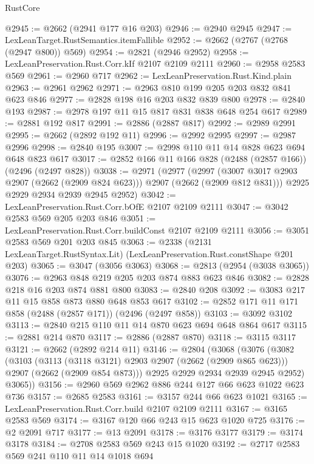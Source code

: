 \begin{lexlean}{RustCore}
\begin{coremodule}
@2945 := @2662 (@2941 @177 @16 @203)
@2946 := @2940 @2945
@2947 := LexLeanTarget.RustSemantics.itemFallible
@2952 := @2662 (@2767 (@2768 (@2947 @800)) @569)
@2954 := @2821 (@2946 @2952)
@2958 := LexLeanPreservation.Rust.Corr.kIf @2107 @2109 @2111
@2960 := @2958 @2583 @569
@2961 := @2960 @717
@2962 := LexLeanPreservation.Rust.Kind.plain
@2963 := @2961 @2962
@2971 := @2963 @810 @199 @205 @203 @832 @841 @623 @846
@2977 := @2828 @198 @16 @203 @832 @839 @800
@2978 := @2840 @193
@2987 := @2978 @197 @11 @15 @817 @831 @838 @648 @254 @617
@2989 := @2881 @192 @817
@2991 := @2886 (@2887 @817)
@2992 := @2989 @2991
@2995 := @2662 (@2892 @192 @11)
@2996 := @2992 @2995
@2997 := @2987 @2996
@2998 := @2840 @195
@3007 := @2998 @110 @11 @14 @828 @623 @694 @648 @823 @617
@3017 := @2852 @166 @11 @166 @828 (@2488 (@2857 @166)) (@2496 (@2497 @828))
@3038 := @2971
    (@2977
      (@2997 (@3007 @3017 @2903 @2907 (@2662 (@2909 @824 @623))) @2907 (@2662 (@2909 @812 @831)))
      @2925
      @2929
      @2934
      @2939
      @2945
      @2952)
@3042 := LexLeanPreservation.Rust.Corr.bOfE @2107 @2109 @2111
@3047 := @3042 @2583 @569 @205 @203 @846
@3051 := LexLeanPreservation.Rust.Corr.buildConst @2107 @2109 @2111
@3056 := @3051 @2583 @569 @201 @203 @845
@3063 := @2338 (@2131 LexLeanTarget.RustSyntax.Lit) (LexLeanPreservation.Rust.constShape @201 @203)
@3065 := @3047 (@3056 @3063)
@3068 := @2813 (@2954 (@3038 @3065))
@3076 := @2963 @848 @219 @205 @203 @874 @883 @623 @846
@3082 := @2828 @218 @16 @203 @874 @881 @800
@3083 := @2840 @208
@3092 := @3083 @217 @11 @15 @858 @873 @880 @648 @853 @617
@3102 := @2852 @171 @11 @171 @858 (@2488 (@2857 @171)) (@2496 (@2497 @858))
@3103 := @3092 @3102
@3113 := @2840 @215 @110 @11 @14 @870 @623 @694 @648 @864 @617
@3115 := @2881 @214 @870
@3117 := @2886 (@2887 @870)
@3118 := @3115 @3117
@3121 := @2662 (@2892 @214 @11)
@3146 := @2804
    (@3068
      (@3076
        (@3082
          (@3103
            (@3113 (@3118 @3121) @2903 @2907 (@2662 (@2909 @865 @623)))
            @2907
            (@2662 (@2909 @854 @873)))
          @2925
          @2929
          @2934
          @2939
          @2945
          @2952)
        @3065))
@3156 := @2960 @569 @2962 @886 @244 @127 @66 @623 @1022 @623 @736
@3157 := @2685 @2583
@3161 := @3157 @244 @66 @623 @1021
@3165 := LexLeanPreservation.Rust.Corr.build @2107 @2109 @2111
@3167 := @3165 @2583 @569
@3174 := @3167 @120 @66 @243 @15 @623 @1020 @725
@3176 := @2 @2091 @717
@3177 := @13 @2091
@3178 := @3176 @3177
@3179 := @3174 @3178
@3184 := @2708 @2583 @569 @243 @15 @1020
@3192 := @2717 @2583 @569 @241 @110 @11 @14 @1018 @694

\end{coremodule}
\end{lexlean}
